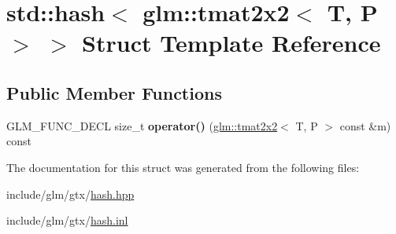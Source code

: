 \hypertarget{structstd_1_1hash_3_01glm_1_1tmat2x2_3_01T_00_01P_01_4_01_4}{}\section{std\+:\+:hash$<$ glm\+:\+:tmat2x2$<$ T, P $>$ $>$ Struct Template Reference}
\label{structstd_1_1hash_3_01glm_1_1tmat2x2_3_01T_00_01P_01_4_01_4}
\subsection*{Public Member Functions}
\begin{DoxyCompactItemize}
\item 
\mbox{\label{structstd_1_1hash_3_01glm_1_1tmat2x2_3_01T_00_01P_01_4_01_4_a11195c425e2a14d50317c433c0a68562}} 
G\+L\+M\+\_\+\+F\+U\+N\+C\+\_\+\+D\+E\+CL size\+\_\+t {\bfseries operator()} (\hyperlink{structglm_1_1tmat2x2}{glm\+::tmat2x2}$<$ T, P $>$ const \&m) const
\end{DoxyCompactItemize}


The documentation for this struct was generated from the following files\+:\begin{DoxyCompactItemize}
\item 
include/glm/gtx/\hyperlink{hash_8hpp}{hash.\+hpp}\item 
include/glm/gtx/\hyperlink{hash_8inl}{hash.\+inl}\end{DoxyCompactItemize}
